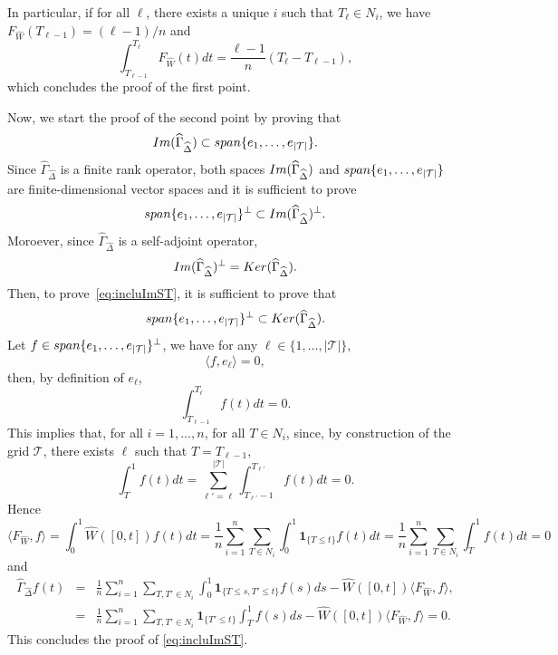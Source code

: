 \documentclass[aos]{imsart}
\theoremstyle{plain}
\theoremstyle{remark}
\newcommand{\1}{1}
\begin{document}
In particular, if for all $\ell$, there exists a unique $i$ such that $T_\ell\in N_i$, we have $F_{\widehat W}(T_{\ell-1})=(\ell-1)/n$ and
\[
\int_{T_{\ell-1}}^{T_\ell}F_{\widehat W}(t)dt=\frac{\ell-1}n(T_\ell-T_{\ell-1}),
\]
which concludes the proof of the first point.

Now, we start the proof of the second point by proving that 
\begin{equation}\label{eq:incluImST}
{\rm Im}(\widehat\Gamma_{\widehat\Delta})\subset{\rm span}\{e_1,\hdots,e_{|\mathcal T|} \}. 
\end{equation}
Since $\widehat\Gamma_{\widehat\Delta}$ is a finite rank operator, both spaces ${\rm Im}(\widehat\Gamma_{\widehat\Delta})$ and ${\rm span}\{e_1,\hdots,e_{|\mathcal T|}\}$ are finite-dimensional vector spaces and it is sufficient to prove 
\[
{\rm span}\{e_1,\hdots,e_{|\mathcal T|} \}^{\perp}\subset {\rm Im}(\widehat\Gamma_{\widehat\Delta})^{\perp}. 
\]
Moroever, since $\widehat\Gamma_{\widehat\Delta}$ is a self-adjoint operator, 
\[
 {\rm Im}(\widehat\Gamma_{\widehat\Delta})^{\perp}= {\rm Ker}(\widehat\Gamma_{\widehat\Delta}). 
 \]
 Then, to prove~\eqref{eq:incluImST}, it is sufficient to prove that 
 \[
{\rm span}\{e_1,\hdots,e_{|\mathcal T|} \}^{\perp}\subset  {\rm Ker}(\widehat\Gamma_{\widehat\Delta}). 
\]
Let $f\in{\rm span}\{e_1,\hdots,e_{|\mathcal T|} \}^{\perp}$, we have for any $\ell\in\{1,\ldots,|\mathcal T|\}$,
\[
\langle f,e_\ell\rangle =0,
\]
then, by definition of $e_\ell$, 
\[
\int_{T_{\ell-1}}^{T_\ell}f(t)dt=0. 
\]
This implies that, for all $i=1,\hdots,n$, for all $T\in N_i$, since, by construction of the grid $\mathcal T$,  there exists $\ell$ such that $T = T_{\ell-1}$, 
\[
\int_{T}^1 f(t) dt = \sum_{\ell'=\ell}^{|\mathcal T|}\int_{T_{\ell'}-1}^{T_{\ell'}}f(t)dt = 0. 
\]
Hence
\[
\langle F_{\widehat W}, f\rangle = \int_0^1 \widehat W([0,t]) f(t)dt =\frac1n\sum_{i=1}^n\sum_{T\in N_i}\int_0^1\mathbf 1_{\{T\leq t\}}f(t)dt = \frac1n\sum_{i=1}^n\sum_{T\in N_i}\int_T^1f(t)dt=0
\]
and 
\begin{eqnarray*}
\widehat\Gamma_{\widehat\Delta}f (t) &=&  \frac1n\sum_{i=1}^n\sum_{T,T'\in N_i}\int_0^1\mathbf 1_{\{T\leq s, T'\leq t\}}f(s) ds-\widehat W([0,t])\langle F_{\widehat W},f\rangle,\\
&=&\frac1n\sum_{i=1}^n\sum_{T,T'\in N_i}\mathbf 1_{\{T'\leq t\}}\int_T^1f(s) ds-\widehat W([0,t])\langle F_{\widehat W},f\rangle = 0. 
\end{eqnarray*}
This concludes the proof of \eqref{eq:incluImST}. 
\end{document}
